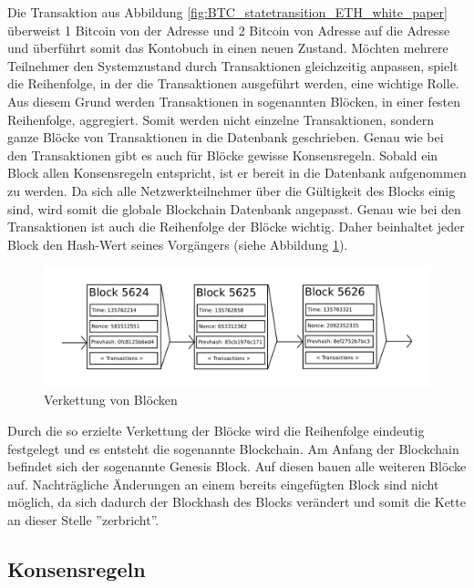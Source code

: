 Die Transaktion aus Abbildung \ref{fig:BTC_statetransition_ETH_white_paper} überweist 1 Bitcoin von der Adresse  und 2 Bitcoin von Adresse  auf die Adresse  und überführt somit das Kontobuch in einen neuen Zustand. Möchten mehrere Teilnehmer den Systemzustand durch Transaktionen gleichzeitig anpassen, spielt die Reihenfolge, in der die Transaktionen ausgeführt werden, eine wichtige Rolle. Aus diesem Grund werden Transaktionen in sogenannten Blöcken, in einer festen Reihenfolge, aggregiert. Somit werden nicht einzelne Transaktionen, sondern ganze Blöcke von Transaktionen in die Datenbank geschrieben. Genau wie bei den Transaktionen gibt es auch für Blöcke gewisse Konsensregeln. Sobald ein Block allen Konsensregeln entspricht, ist er bereit in die Datenbank aufgenommen zu werden.
Da sich alle Netzwerkteilnehmer über die Gültigkeit des Blocks einig sind, wird somit die globale Blockchain Datenbank angepasst. Genau wie bei den Transaktionen ist auch die Reihenfolge der Blöcke wichtig. Daher beinhaltet jeder Block den Hash-Wert seines Vorgängers (siehe Abbildung \ref{fig:blockchain_ETH_white_paper}).

\begin{figure}[H]
\centering
\includegraphics[width=1\linewidth]{Figures/blockchain_ETH_white_paper}
\decoRule
\caption[Kette von Blöcken]{Verkettung von Blöcken \cite{ethereum_white_paper}}
\label{fig:blockchain_ETH_white_paper}
\end{figure}

Durch die so erzielte Verkettung der Blöcke wird die Reihenfolge eindeutig festgelegt und es entsteht die sogenannte Blockchain. Am Anfang der Blockchain befindet sich der sogenannte Genesis Block. Auf diesen bauen alle weiteren Blöcke auf. Nachträgliche Änderungen an einem bereits eingefügten Block sind nicht möglich, da sich dadurch der Blockhash des Blocks verändert und somit die Kette an dieser Stelle ''zerbricht''.
\newpage
\subsection{Konsensregeln}

